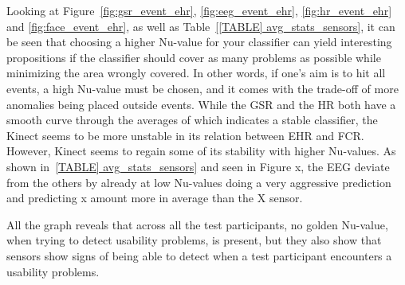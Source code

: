 Looking at Figure~\ref{fig:gsr_event_ehr}, \ref{fig:eeg_event_ehr}, \ref{fig:hr_event_ehr} and \ref{fig:face_event_ehr},
as well as Table~\ref{[TABLE] avg_stats_sensors}, it can be seen that choosing a higher Nu-value for your classifier can yield interesting propositions if the classifier should cover as many problems as possible while minimizing the area wrongly covered.
In other words, if one's aim is to hit all events, a high Nu-value must be chosen, and it comes with the trade-off of
more anomalies being placed outside events. 
While the GSR and the HR both have a smooth curve through the averages of which indicates a stable classifier, the Kinect seems to be more unstable in its relation between EHR and FCR. However, Kinect seems to regain some of its stability with higher Nu-values. As shown in~\ref{TABLE] avg_stats_sensors} and seen in Figure x, the EEG deviate from the others by already at low Nu-values doing a very aggressive prediction and predicting x amount more in average than the X sensor.

All the graph reveals that across all the test participants, no golden Nu-value, when trying to detect usability problems, is present, but they also show that sensors show signs of being able to detect when a test participant encounters a usability problems.
